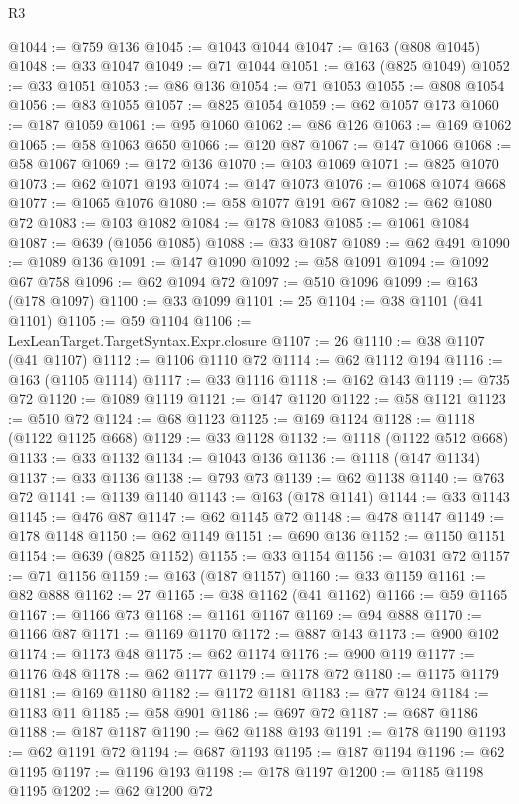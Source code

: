 \begin{lexlean}{R3}
\begin{coremodule}
@1044 := @759 @136
@1045 := @1043 @1044
@1047 := @163 (@808 @1045)
@1048 := @33 @1047
@1049 := @71 @1044
@1051 := @163 (@825 @1049)
@1052 := @33 @1051
@1053 := @86 @136
@1054 := @71 @1053
@1055 := @808 @1054
@1056 := @83 @1055
@1057 := @825 @1054
@1059 := @62 @1057 @173
@1060 := @187 @1059
@1061 := @95 @1060
@1062 := @86 @126
@1063 := @169 @1062
@1065 := @58 @1063 @650
@1066 := @120 @87
@1067 := @147 @1066
@1068 := @58 @1067
@1069 := @172 @136
@1070 := @103 @1069
@1071 := @825 @1070
@1073 := @62 @1071 @193
@1074 := @147 @1073
@1076 := @1068 @1074 @668
@1077 := @1065 @1076
@1080 := @58 @1077 @191 @67
@1082 := @62 @1080 @72
@1083 := @103 @1082
@1084 := @178 @1083
@1085 := @1061 @1084
@1087 := @639 (@1056 @1085)
@1088 := @33 @1087
@1089 := @62 @491
@1090 := @1089 @136
@1091 := @147 @1090
@1092 := @58 @1091
@1094 := @1092 @67 @758
@1096 := @62 @1094 @72
@1097 := @510 @1096
@1099 := @163 (@178 @1097)
@1100 := @33 @1099
@1101 := 25
@1104 := @38 @1101 (@41 @1101)
@1105 := @59 @1104
@1106 := LexLeanTarget.TargetSyntax.Expr.closure
@1107 := 26
@1110 := @38 @1107 (@41 @1107)
@1112 := @1106 @1110 @72
@1114 := @62 @1112 @194
@1116 := @163 (@1105 @1114)
@1117 := @33 @1116
@1118 := @162 @143
@1119 := @735 @72
@1120 := @1089 @1119
@1121 := @147 @1120
@1122 := @58 @1121
@1123 := @510 @72
@1124 := @68 @1123
@1125 := @169 @1124
@1128 := @1118 (@1122 @1125 @668)
@1129 := @33 @1128
@1132 := @1118 (@1122 @512 @668)
@1133 := @33 @1132
@1134 := @1043 @136
@1136 := @1118 (@147 @1134)
@1137 := @33 @1136
@1138 := @793 @73
@1139 := @62 @1138
@1140 := @763 @72
@1141 := @1139 @1140
@1143 := @163 (@178 @1141)
@1144 := @33 @1143
@1145 := @476 @87
@1147 := @62 @1145 @72
@1148 := @478 @1147
@1149 := @178 @1148
@1150 := @62 @1149
@1151 := @690 @136
@1152 := @1150 @1151
@1154 := @639 (@825 @1152)
@1155 := @33 @1154
@1156 := @1031 @72
@1157 := @71 @1156
@1159 := @163 (@187 @1157)
@1160 := @33 @1159
@1161 := @82 @888
@1162 := 27
@1165 := @38 @1162 (@41 @1162)
@1166 := @59 @1165
@1167 := @1166 @73
@1168 := @1161 @1167
@1169 := @94 @888
@1170 := @1166 @87
@1171 := @1169 @1170
@1172 := @887 @143
@1173 := @900 @102
@1174 := @1173 @48
@1175 := @62 @1174
@1176 := @900 @119
@1177 := @1176 @48
@1178 := @62 @1177
@1179 := @1178 @72
@1180 := @1175 @1179
@1181 := @169 @1180
@1182 := @1172 @1181
@1183 := @77 @124
@1184 := @1183 @11
@1185 := @58 @901
@1186 := @697 @72
@1187 := @687 @1186
@1188 := @187 @1187
@1190 := @62 @1188 @193
@1191 := @178 @1190
@1193 := @62 @1191 @72
@1194 := @687 @1193
@1195 := @187 @1194
@1196 := @62 @1195
@1197 := @1196 @193
@1198 := @178 @1197
@1200 := @1185 @1198 @1195
@1202 := @62 @1200 @72

\end{coremodule}
\end{lexlean}
